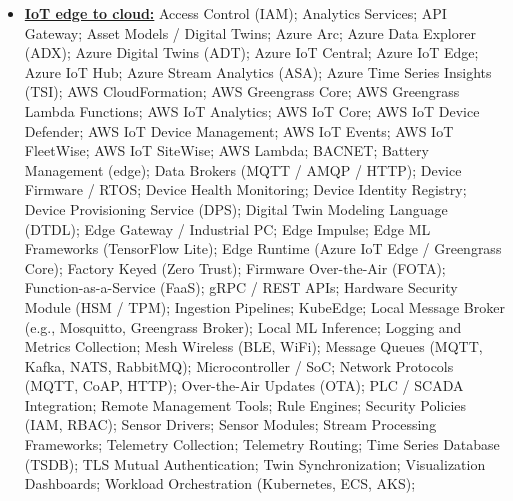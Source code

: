 \documentclass[letterpaper,11pt]{article}
\makeatletter
\newcommand{\resumeItem}[1]{
    \item\small{
            {#1 \vspace{-2pt}}
    }
}
\newcommand{\resumeSubheading}[4]{
    \vspace{-2pt}\item
    \begin{tabular*}{1.0\textwidth}[t]{l@{\extracolsep{\fill}}r}
    \textbf{#1}  \textit{\small#3} & \textbf{\small #2} \\
    \end{tabular*}\vspace{-7pt}
}
\newcommand{\resumeSubHeadingListStart}{\begin{itemize}[leftmargin=0.0in, label={}]}
\newcommand{\resumeSubHeadingListEnd}{\end{itemize}}
\newcommand{\resumeItemListStart}{\begin{itemize}}
\newcommand{\resumeItemListEnd}{\end{itemize}\vspace{-5pt}}
\makeatother
\begin{document}
\begin{multicols}{4}
{\begin{itemize}[leftmargin=0.1in, label={}, itemsep=0pt, parsep=0pt, topsep=0pt, partopsep=0pt]
\item
\textbf{\uline{IoT edge to cloud:}} \hspace{0pt}
Access Control (IAM);
Analytics Services;
API Gateway;
Asset Models / Digital Twins;
Azure Arc;
Azure Data Explorer (ADX);
Azure Digital Twins (ADT);
Azure IoT Central;
Azure IoT Edge;
Azure IoT Hub;
Azure Stream Analytics (ASA);
Azure Time Series Insights (TSI);
AWS CloudFormation;
AWS Greengrass Core;
AWS Greengrass Lambda Functions;
AWS IoT Analytics;
AWS IoT Core;
AWS IoT Device Defender;
AWS IoT Device Management;
AWS IoT Events;
AWS IoT FleetWise;
AWS IoT SiteWise;
AWS Lambda;
BACNET;
Battery Management (edge);
Data Brokers (MQTT / AMQP / HTTP);
Device Firmware / RTOS;
Device Health Monitoring;
Device Identity Registry;
Device Provisioning Service (DPS);
Digital Twin Modeling Language (DTDL);
Edge Gateway / Industrial PC;
Edge Impulse;
Edge ML Frameworks (TensorFlow Lite);
Edge Runtime (Azure IoT Edge / Greengrass Core);
Factory Keyed (Zero Trust);
Firmware Over-the-Air (FOTA);
Function-as-a-Service (FaaS);
gRPC / REST APIs;
Hardware Security Module (HSM / TPM);
Ingestion Pipelines;
KubeEdge;
Local Message Broker (e.g., Mosquitto, Greengrass Broker);
Local ML Inference;
Logging and Metrics Collection;
Mesh Wireless (BLE, WiFi);
Message Queues (MQTT, Kafka, NATS, RabbitMQ);
Microcontroller / SoC;
Network Protocols (MQTT, CoAP, HTTP);
Over-the-Air Updates (OTA);
PLC / SCADA Integration;
Remote Management Tools;
Rule Engines;
Security Policies (IAM, RBAC);
Sensor Drivers;
Sensor Modules;
Stream Processing Frameworks;
Telemetry Collection;
Telemetry Routing;
Time Series Database (TSDB);
TLS Mutual Authentication;
Twin Synchronization;
Visualization Dashboards;
Workload Orchestration (Kubernetes, ECS, AKS);
\end{itemize}
}
\end{multicols}


\end{document}
